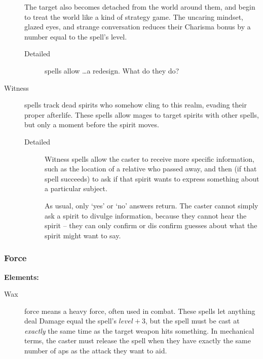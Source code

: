 \begin{multicols}{2}
\begin{description}
    The target also becomes detached from the world around them, and begin to treat the world like a kind of strategy game.
    The uncaring mindset, glazed eyes, and strange conversation reduces their Charisma bonus by a number equal to the spell's level.
    \begin{description}
      \item[Detailed]
        spells allow \ldots a redesign. What do they do?
    \end{description}
  \item[Witness]
    spells track dead spirits who somehow cling to this realm, evading their proper afterlife.%
    These spells allow mages to target spirits with other spells, but only a moment before the spirit moves.
    \begin{description}
      \item[Detailed]
        Witness spells allow the caster to receive more specific information, such as the location of a relative who passed away, and then (if that spell succeeds) to ask if that spirit wants to express something about a particular subject.

        As usual, only `yes' or `no' answers return.
        The caster cannot simply ask a spirit to divulge information, because they cannot hear the spirit -- they can only confirm or dis confirm guesses about what the spirit might want to say.
    \end{description}
\end{description}

\subsubsection{Force}

\textbf{Elements:}

\begin{description}
  \item[Wax]
  force means a heavy force, often used in combat.
  These spells let anything deal Damage equal the spell's $level + 3$, but the spell must be cast at \emph{exactly} the same time as the target weapon hits something.
  In mechanical terms, the caster must release the spell when they have exactly the same number of \glspl{ap} as the attack they want to aid.


\end{description}
\end{multicols}
